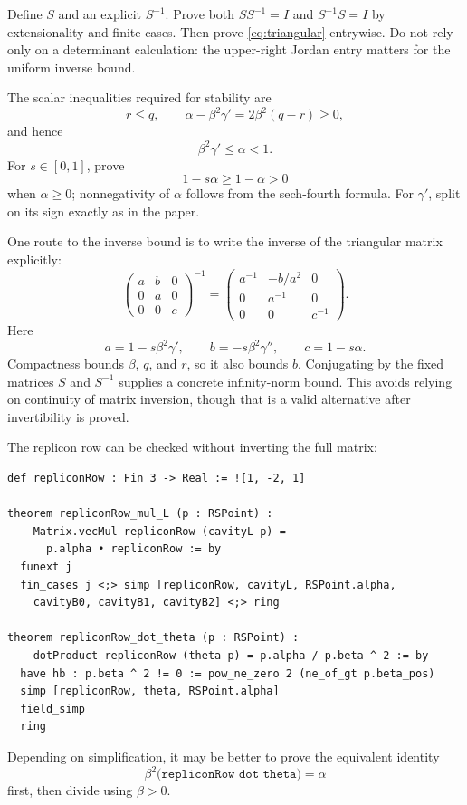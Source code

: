 \documentclass[11pt]{article}
\numberwithin{equation}{section}
\newcommand{\1}{\mathbf 1}
\begin{document}
Define $S$ and an explicit $S^{-1}$.  Prove both
$SS^{-1}=I$ and $S^{-1}S=I$ by extensionality and finite cases.  Then prove
\eqref{eq:triangular} entrywise.  Do not rely only on a determinant
calculation: the upper-right Jordan entry matters for the uniform inverse
bound.

The scalar inequalities required for stability are
\[
r\le q,\qquad
\alpha-\beta^2\gamma'=2\beta^2(q-r)\ge0,
\]
and hence
\[
 \beta^2\gamma'\le\alpha<1.
\]
For $s\in[0,1]$, prove
\[
1-s\alpha\ge1-\alpha>0
\]
when $\alpha\ge0$; nonnegativity of $\alpha$ follows from the sech-fourth
formula.  For $\gamma'$, split on its sign exactly as in the paper.

One route to the inverse bound is to write the inverse of the triangular
matrix explicitly:
\[
 \begin{pmatrix}
 a&b&0\\0&a&0\\0&0&c
 \end{pmatrix}^{-1}
 =
 \begin{pmatrix}
 a^{-1}&-b/a^2&0\\0&a^{-1}&0\\0&0&c^{-1}
 \end{pmatrix}.
\]
Here
\[
a=1-s\beta^2\gamma',\qquad
b=-s\beta^2\gamma'',\qquad
c=1-s\alpha.
\]
Compactness bounds $\beta$, $q$, and $r$, so it also bounds $b$.  Conjugating
by the fixed matrices $S$ and $S^{-1}$ supplies a concrete infinity-norm
bound.  This avoids relying on continuity of matrix inversion, though that
is a valid alternative after invertibility is proved.

The replicon row can be checked without inverting the full matrix:
\begin{lstlisting}
def repliconRow : Fin 3 -> Real := ![1, -2, 1]

theorem repliconRow_mul_L (p : RSPoint) :
    Matrix.vecMul repliconRow (cavityL p) =
      p.alpha • repliconRow := by
  funext j
  fin_cases j <;> simp [repliconRow, cavityL, RSPoint.alpha,
    cavityB0, cavityB1, cavityB2] <;> ring

theorem repliconRow_dot_theta (p : RSPoint) :
    dotProduct repliconRow (theta p) = p.alpha / p.beta ^ 2 := by
  have hb : p.beta ^ 2 != 0 := pow_ne_zero 2 (ne_of_gt p.beta_pos)
  simp [repliconRow, theta, RSPoint.alpha]
  field_simp
  ring
\end{lstlisting}
Depending on simplification, it may be better to prove the equivalent
identity
\[
 \beta^2\bigl(\texttt{repliconRow dot theta}\bigr)=\alpha
\]
first, then divide using $\beta>0$.
\end{document}
